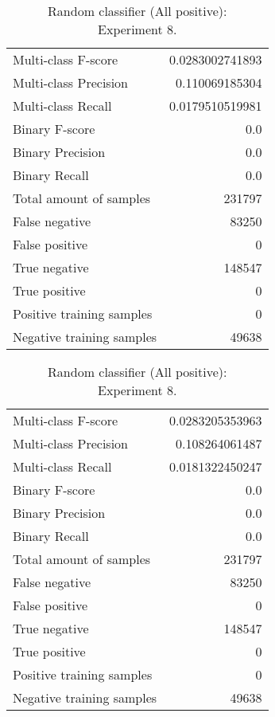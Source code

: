 \begin{table}[H]
\begin{minipage}{0.5\textwidth}
\caption{Random classifier (All positive): \\Experiment 7.}
\centering
\begin{tabular}{l r}
\toprule
Multi-class F-score & 0.0283002741893 \\
Multi-class Precision & 0.110069185304 \\
Multi-class Recall & 0.0179510519981 \\
\midrule
Binary F-score & 0.0 \\
Binary Precision & 0.0 \\
Binary Recall & 0.0 \\
\midrule
Total amount of samples & 231797 \\
False negative & 83250 \\
False positive & 0 \\
True negative & 148547 \\
True positive & 0 \\
\midrule
Positive training samples & 0 \\
Negative training samples & 49638 \\
\bottomrule
\end{tabular}
\end{minipage}
\hfillx
\begin{minipage}{0.5\textwidth}
\caption{Random classifier (All positive): \\Experiment 8.}
\centering
\begin{tabular}{l r}
\toprule
Multi-class F-score & 0.0283205353963 \\
Multi-class Precision & 0.108264061487 \\
Multi-class Recall & 0.0181322450247 \\
\midrule
Binary F-score & 0.0 \\
Binary Precision & 0.0 \\
Binary Recall & 0.0 \\
\midrule
Total amount of samples & 231797 \\
False negative & 83250 \\
False positive & 0 \\
True negative & 148547 \\
True positive & 0 \\
\midrule
Positive training samples & 0 \\
Negative training samples & 49638 \\
\bottomrule
\end{tabular}
\end{minipage}
\end{table}
